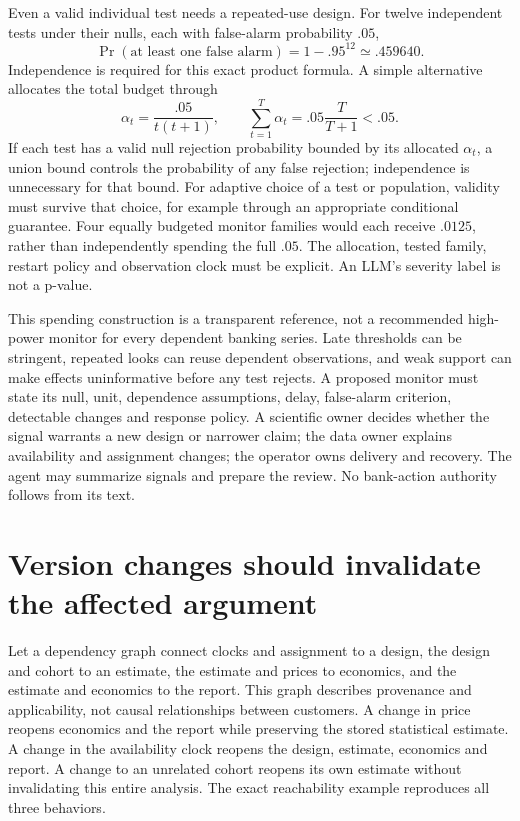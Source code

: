 Even a valid individual test needs a repeated-use design. For twelve independent
tests under their nulls, each with false-alarm probability \(.05\),
\[
 \Pr(\text{at least one false alarm})=1-.95^{12}
       \simeq .459640.
\]
Independence is required for this exact product formula. A simple alternative
allocates the total budget through
\[
 \alpha_t=\frac{.05}{t(t+1)},\qquad
 \sum_{t=1}^{T}\alpha_t=.05\frac{T}{T+1}<.05.
\]
If each test has a valid null rejection probability bounded by its allocated
\(\alpha_t\), a union bound controls the probability of any false rejection;
independence is unnecessary for that bound. For adaptive choice of a test or
population, validity must survive that choice, for example through an
appropriate conditional guarantee. Four equally budgeted monitor families
would each receive \(.0125\), rather than independently spending the full
\(.05\). The allocation, tested family, restart policy and observation clock
must be explicit. An LLM's severity label is not a p-value.
\citep{exec16_report_oracle}

This spending construction is a transparent reference, not a recommended
high-power monitor for every dependent banking series. Late thresholds can
be stringent, repeated looks can reuse dependent observations, and weak support
can make effects uninformative before any test rejects. A proposed monitor
must state its null, unit, dependence assumptions, delay, false-alarm criterion,
detectable changes and response policy. A scientific owner decides whether the
signal warrants a new design or narrower claim; the data owner explains
availability and assignment changes; the operator owns delivery and recovery.
The agent may summarize signals and prepare the review. No bank-action
authority follows from its text.

\section{Version changes should invalidate the affected argument}

Let a dependency graph connect clocks and assignment to a design, the design
and cohort to an estimate, the estimate and prices to economics, and the
estimate and economics to the report. This graph describes provenance and
applicability, not causal relationships between customers. A change in price
reopens economics and the report while preserving the stored statistical
estimate. A change in the availability clock reopens the design, estimate,
economics and report. A change to an unrelated cohort reopens its own estimate
without invalidating this entire analysis. The exact reachability example
reproduces all three behaviors.
\citep{exec16_report_oracle}

